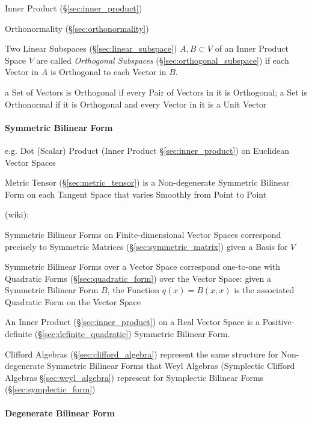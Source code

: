 {{\fist Inner Product (\S\ref{sec:inner_product})

\fist Orthonormality (\S\ref{sec:orthonormality})

Two Linear Subspaces (\S\ref{sec:linear_subspace}) $A, B \subset V$ of an Inner
Product Space $V$ are called \emph{Orthogonal Subspaces}
(\S\ref{sec:orthogonal_subspace}) if each Vector in $A$ is Orthogonal to each
Vector in $B$.

a Set of Vectors is Orthogonal if every Pair of Vectors in it is Orthogonal; a
Set is Orthonormal if it is Orthogonal and every Vector in it is a Unit Vector



\paragraph{Symmetric Bilinear Form}\label{sec:symmetric_bilinear}\hfill

e.g. Dot (Scalar) Product (Inner Product \S\ref{sec:inner_product}) on
Euclidean Vector Spaces

Metric Tensor (\S\ref{sec:metric_tensor}) is a Non-degenerate Symmetric Bilinear
Form on each Tangent Space that varies Smoothly from Point to Point

(wiki):

Symmetric Bilinear Forms on Finite-dimensional Vector Spaces correspond
precisely to Symmetric Matrices (\S\ref{sec:symmetric_matrix}) given a Basis
for $V$

Symmetric Bilinear Forms over a Vector Space correspond one-to-one with
Quadratic Forms (\S\ref{sec:quadratic_form}) over the Vector Space: given a
Symmetric Bilinear Form $B$, the Function $q(x) = B(x,x)$ is the associated
Quadratic Form on the Vector Space

An Inner Product (\S\ref{sec:inner_product}) on a Real Vector Space is
a Positive-definite (\S\ref{sec:definite_quadratic}) Symmetric
Bilinear Form.

Clifford Algebras (\S\ref{sec:clifford_algebra}) represent the same structure
for Non-degenerate Symmetric Bilinear Forms that Weyl Algebras (Symplectic
Clifford Algebras \S\ref{sec:weyl_algebra}) represent for Symplectic Bilinear
Forms (\S\ref{sec:symplectic_form})



\paragraph{Degenerate Bilinear Form}
\label{sec:degenerate_bilinear_form}\hfill

}}
